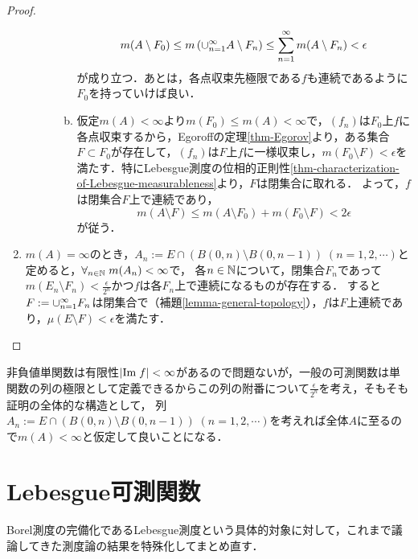 \documentclass[uplatex, dvipdfmx]{jsreport}
\begin{document}
\begin{proof}
\begin{enumerate}
\begin{description}
\begin{enumerate}[(a)]
                \[m(A\setminus F_0)\le m\left(\cup_{n=1}^\infty A\setminus F_n\right)\le\sum_{n=1}^\infty m(A\setminus F_n)<\epsilon\]
                が成り立つ．あとは，各点収束先極限である$f$も連続であるように$F_0$を持っていけば良い．
                \item 仮定$m(A)<\infty$より$m(F_0)\le m(A)<\infty$で，$(f_n)$は$F_0$上$f$に各点収束するから，Egoroffの定理\ref{thm-Egorov}より，ある集合$F\subset F_0$が存在して，$(f_n)$は$F$上$f$に一様収束し，$m(F_0\setminus F)<\epsilon$を満たす．特にLebesgue測度の位相的正則性\ref{thm-characterization-of-Lebesgue-measurableness}より，$F$は閉集合に取れる．
                よって，$f$は閉集合$F$上で連続であり，
                \[m(A\setminus F)\le m(A\setminus F_0)+m(F_0\setminus F)<2\epsilon\]
                が従う．
            \end{enumerate}
        \end{description}
        \item $m(A)=\infty$のとき，$A_n:=E\cap(B(0,n)\setminus B(0,n-1))\;(n=1,2,\cdots)$と定めると，$\forall_{n\in\mathbb{N}}\;m(A_n)<\infty$で，
        各$n\in\mathbb{N}$について，閉集合$F_n$であって$m(E_n\setminus F_n)<\frac{\epsilon}{2^n}$かつ$f$は各$F_n$上で連続になるものが存在する．
        すると$F:=\cup_{n=1}^\infty F_n$は閉集合で（補題\ref{lemma-general-topology}），$f$は$F$上連続であり，$\mu(E\setminus F)<\epsilon$を満たす．
    \end{enumerate}
\end{proof}
\begin{remarks}[測度論の議論の仕方の特徴がよく出ている]
    非負値単関数は有限性$\lvert\mathrm{Im}\; f\rvert<\infty$があるので問題ないが，一般の可測関数は単関数の列の極限として定義できるからこの列の附番について$\frac{\epsilon}{2^n}$を考え，そもそも証明の全体的な構造として，
    列$A_n:=E\cap(B(0,n)\setminus B(0,n-1))\;(n=1,2,\cdots)$を考えれば全体$A$に至るので$m(A)<\infty$と仮定して良いことになる．
\end{remarks}

\section{Lebesgue可測関数}

\begin{tcolorbox}[colframe=ForestGreen, colback=ForestGreen!10!white,breakable,colbacktitle=ForestGreen!40!white,coltitle=black,fonttitle=\bfseries\sffamily,
title=]
    Borel測度の完備化であるLebesgue測度という具体的対象に対して，これまで議論してきた測度論の結果を特殊化してまとめ直す．
\end{tcolorbox}
\end{document}
